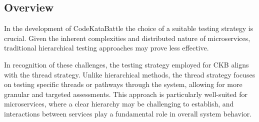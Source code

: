 \subsection{Overview}
In the development of CodeKataBattle the choice of a suitable testing strategy is crucial. Given the inherent complexities and distributed nature of microservices, traditional hierarchical testing approaches may prove less effective.

In recognition of these challenges, the testing strategy employed for CKB aligns with the thread strategy. Unlike hierarchical methods, the thread strategy focuses on testing specific threads or pathways through the system, allowing for more granular and targeted assessments. This approach is particularly well-suited for microservices, where a clear hierarchy may be challenging to establish, and interactions between services play a fundamental role in overall system behavior.

